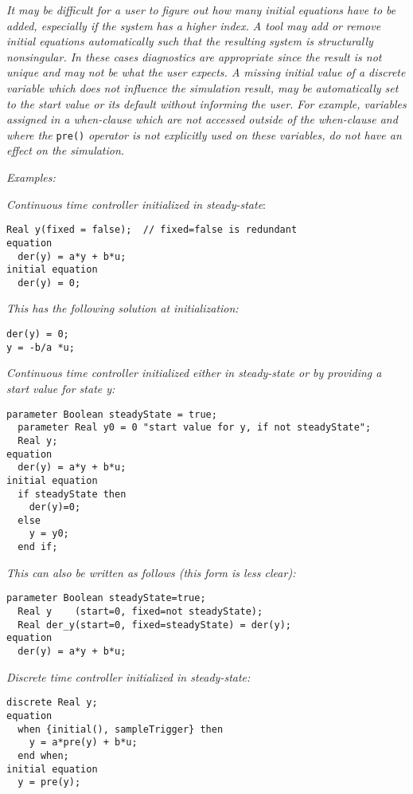 \emph{It may be difficult for a user to figure out how many initial
equations have to be added, especially if the system has a higher index.
A tool may add or remove initial equations automatically such that the
resulting system is structurally nonsingular. In these cases diagnostics
are appropriate since the result is not unique and may not be what the
user expects. A missing initial value of a discrete variable which does
not influence the simulation result, may be automatically set to the
start value or its default without informing the user. For example,
variables assigned in a when-clause which are not accessed outside of
the when-clause and where the} \lstinline!pre()! \emph{operator is not explicitly
used on these variables, do not have an effect on the simulation.}

\emph{Examples:}

\emph{Continuous time controller initialized in steady-state}:
\begin{lstlisting}[language=modelica]
  Real y(fixed = false);  // fixed=false is redundant
equation
  der(y) = a*y + b*u;
initial equation
  der(y) = 0;
\end{lstlisting}

\emph{This has the following solution at initialization:}
\begin{lstlisting}[language=modelica]
der(y) = 0;
y = -b/a *u;
\end{lstlisting}

\emph{Continuous time controller initialized either in steady-state or
by providing a start value for state y:}
\begin{lstlisting}[language=modelica]
  parameter Boolean steadyState = true;
  parameter Real y0 = 0 "start value for y, if not steadyState";
  Real y;
equation
  der(y) = a*y + b*u;
initial equation
  if steadyState then
    der(y)=0;
  else
    y = y0;
  end if;
\end{lstlisting}

\emph{This can also be written as follows (this form is less clear):}
\begin{lstlisting}[language=modelica]
  parameter Boolean steadyState=true;
  Real y    (start=0, fixed=not steadyState);
  Real der_y(start=0, fixed=steadyState) = der(y);
equation
  der(y) = a*y + b*u;
\end{lstlisting}

\emph{Discrete time controller initialized in steady-state:}
\begin{lstlisting}[language=modelica]
  discrete Real y;
equation
  when {initial(), sampleTrigger} then
    y = a*pre(y) + b*u;
  end when;
initial equation
  y = pre(y);
\end{lstlisting}


